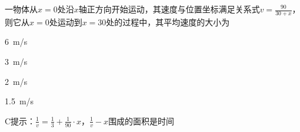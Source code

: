 一物体从\(x = 0\)处沿\(x\)轴正方向开始运动，其速度与位置坐标满足关系式\(v = \frac{90}{30 + x}\)，则它从\(x = 0\)处运动到\(x = 30\)处的过程中，其平均速度的大小为\paren[C]
\begin{choices}
    \item \qty{6}{m/s}
    \item \qty{3}{m/s}
    \item \qty{2}{m/s}
    \item \qty{1.5}{m/s}
\end{choices}
\begin{answer}
    C\qquad 提示：\(\frac{1}{v} = \frac{1}{3} + \frac{1}{90}\cdot x \)，\(\frac{1}{v} - x\)围成的面积是时间
\end{answer}